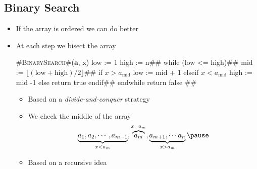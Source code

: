 \begin{slide}
\section[-1]{Binary Search}

\begin{PauseHighLight}
\begin{itemize}
\item If the array is ordered we can do better\pause
\item At each step we bisect the array\pause\\
\begin{minipage}{7cm}
\begin{pseudo}
#\textsc{BinarySearch}#($\bm{a}$, x)
{
  low := 1
  high := n#\pause#
  while (low <= high)#\pause#
    mid := $\lfloor (\mbox{low} + \mbox{high})/2 \rfloor$#\pause#
    if $x > a_{\mbox{mid}}$
      low := mid + 1
    elseif $x < a_{\mbox{mid}}$
      high := mid -1
    else
      return true
    endif#\pause#
  endwhile
  return false
}#\pause#
\end{pseudo}
\end{minipage}\hfill
\begin{minipage}{15cm}\raggedright
  \begin{itemize}
  \item Based on a \emph{divide-and-conquer} strategy\pause
  \item We check the middle of the array
    \begin{align*}
      \underbrace{a_1, a_2, \cdots, a_{m-1}}_{x<a_m}, \overbrace{a_m}^{x=a_m}, 
      \underbrace{a_{m+1}, \cdots a_n}_{x>a_m}\pause
    \end{align*}
  \item Based on a recursive idea\pause
  \end{itemize}
\end{minipage}
\end{itemize}
\end{PauseHighLight}
\end{slide}


\begin{slide}
\section[2]{Binary Search in Action}
\pb
\pause

\begin{center}
  \texttt{[image: binary-search0]}
  }
\end{center}

\end{slide}



